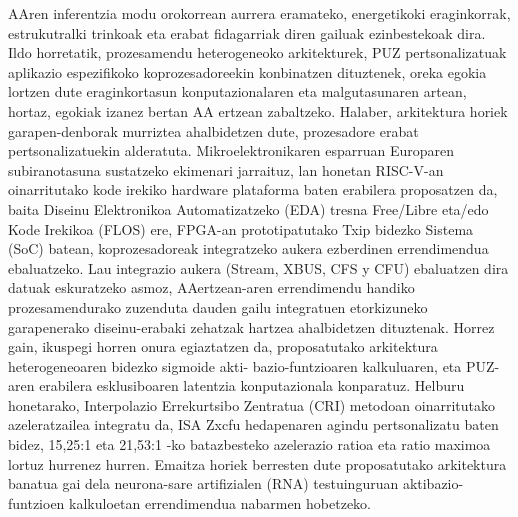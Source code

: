 \documentclass[
11pt, %
spanish, %
singlespacing, %
headsepline, %
]{MastersDoctoralThesis} %
\begin{document}

\begin{Laburpena}
\addchaptertocentry{\resumennameeus} %
AAren inferentzia modu orokorrean aurrera eramateko, energetikoki eraginkorrak, estrukutralki trinkoak eta erabat fidagarriak diren gailuak ezinbestekoak dira. 
Ildo horretatik, prozesamendu heterogeneoko arkitekturek, PUZ pertsonalizatuak aplikazio espezifikoko koprozesadoreekin konbinatzen dituztenek, oreka egokia lortzen dute eraginkortasun konputazionalaren eta malgutasunaren artean, hortaz, egokiak izanez bertan AA ertzean zabaltzeko. 
Halaber, arkitektura horiek garapen-denborak murriztea ahalbidetzen dute, prozesadore erabat pertsonalizatuekin alderatuta. 
Mikroelektronikaren esparruan Europaren subiranotasuna sustatzeko ekimenari jarraituz, lan honetan RISC-V-an oinarritutako kode irekiko hardware plataforma baten erabilera proposatzen da, baita Diseinu Elektronikoa Automatizatzeko (EDA) tresna Free/Libre eta/edo Kode Irekikoa (FLOS) ere, FPGA-an prototipatutako Txip bidezko Sistema (SoC) batean, koprozesadoreak integratzeko aukera ezberdinen errendimendua ebaluatzeko. 
Lau integrazio aukera (Stream, XBUS, CFS y CFU) ebaluatzen dira datuak eskuratzeko asmoz, AAertzean-aren errendimendu handiko prozesamendurako zuzenduta dauden gailu integratuen etorkizuneko garapenerako diseinu-erabaki zehatzak hartzea ahalbidetzen dituztenak. 
Horrez gain, ikuspegi horren onura egiaztatzen da, proposatutako arkitektura heterogeneoaren bidezko sigmoide akti- bazio-funtzioaren kalkuluaren, eta PUZ-aren erabilera esklusiboaren latentzia konputazionala konparatuz. 
Helburu honetarako, Interpolazio Errekurtsibo Zentratua (CRI) metodoan oinarritutako azeleratzailea integratu da, ISA Zxcfu hedapenaren agindu pertsonalizatu baten bidez, 15,25:1 eta 21,53:1 -ko batazbesteko azelerazio  ratioa eta ratio maximoa lortuz hurrenez hurren. 
Emaitza horiek berresten dute proposatutako arkitektura banatua gai dela neurona-sare artifizialen (RNA) testuinguruan aktibazio-funtzioen kalkuloetan errendimendua nabarmen hobetzeko.
\end{Laburpena}

\end{document}
